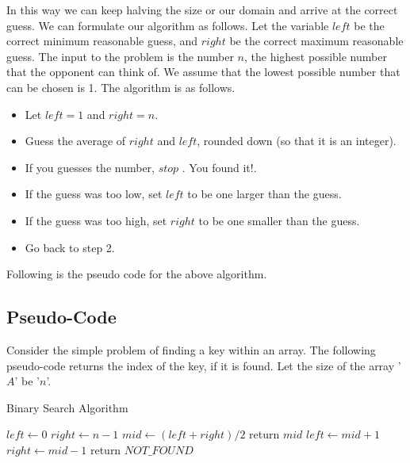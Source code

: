 \documentclass{article}
\begin{document}
In this way we can keep halving the size or our domain and arrive at the correct guess.
We can formulate our algorithm as follows. Let the variable $left$ be the correct minimum reasonable guess, and $right$ be the correct maximum reasonable guess. The input to the problem is the number $n$, the highest possible number that the opponent can think of. We assume that the lowest possible number that can be chosen is 1. The algorithm is as follows. \cite{khan}

\begin{itemize}
\item Let $left = 1$ and $right=n$.
\item Guess the average of $right$ and $left$, rounded down (so that it is an integer).
\item If you guesses the number, $stop$ . You found it!.
\item If the guess was too low, set $left$ to be one larger than the guess.
\item If the guess was too high, set $right$ to be one smaller than the guess.
\item Go back to step 2.
\end{itemize}

Following is the pseudo code for the above algorithm.
\subsection{Pseudo-Code}
Consider the simple problem of finding a key within an array. The following pseudo-code returns the index of the key, if it is found. Let the size of the array '$A$' be '$n$'. \cite{wiki}


\begin{algorithm}
\caption{Binary Search Algorithm}
\label{binalgo}
\begin{algorithmic}[1]
\State $left \gets 0 $
\State $right \gets n-1 $
\State $mid \gets (left+right)/2 $
\State return $mid$
   
\State $left \gets mid + 1 $ 
\Else  {}
\State $right \gets mid - 1$
\EndIf
\EndWhile
\State return $NOT\_FOUND$
\EndProcedure
\end{algorithmic}
\end{algorithm}
\end{document}
